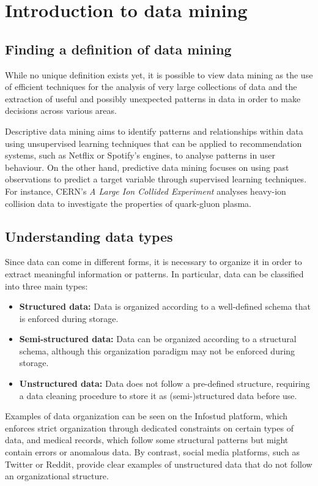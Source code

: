 \documentclass{report}
\begin{document}
\tableofcontents

\chapter{Introduction to data mining}
\section{Finding a definition of data mining}
While no unique definition exists yet, it is possible to view data mining as the use of efficient techniques for the analysis of very large collections of data and the extraction of useful and possibly unexpected patterns in data in order to make decisions across various areas.
\begin{examplebox}
    Descriptive data mining aims to identify patterns and relationships within data using unsupervised learning techniques that can be applied to recommendation systems, such as Netflix or Spotify's engines, to analyse patterns in user behaviour. \newline
    On the other hand, predictive data mining focuses on using past observations to predict a target variable through supervised learning techniques. \newline
    For instance, CERN's \textit{A Large Ion Collided Experiment} analyses heavy-ion collision data to investigate the properties of quark-gluon plasma.
\end{examplebox}
\section{Understanding data types}
Since data can come in different forms, it is necessary to organize it in order to extract meaningful information or patterns. \newline
In particular, data can be classified into three main types:
\begin{itemize}
    \item \textbf{Structured data: }Data is organized according to a well-defined schema that is enforced during storage.
    \item \textbf{Semi-structured data: }Data can be organized according to a structural schema, although this organization paradigm may not be enforced during storage.
    \item \textbf{Unstructured data: }Data does not follow a pre-defined structure, requiring a data cleaning procedure to store it as (semi-)structured data before use.
\end{itemize}
\begin{examplebox}
    Examples of data organization can be seen on the Infostud platform, which enforces strict organization through dedicated constraints on certain types of data, and medical records, which follow some structural patterns but might contain errors or anomalous data. \newline
    By contrast, social media platforms, such as Twitter or Reddit, provide clear examples of unstructured data that do not follow an organizational structure.
\end{examplebox}
\end{document}
